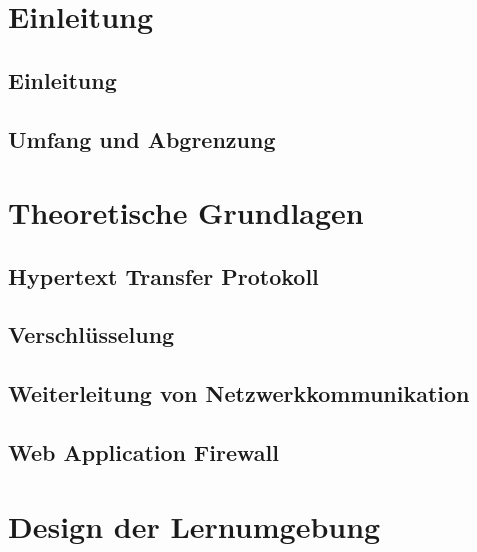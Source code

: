 \documentclass[a4paper, 12pt]{article}
\begin{document}
    
    
    

    \section{Einleitung}
    \subsection{Einleitung}
    
    \subsection{Umfang und Abgrenzung}
    
    \pagebreak

    \section{Theoretische Grundlagen}
    \label{sec:theoretical-foundations}
    \subsection{Hypertext Transfer Protokoll}
    
    \subsection{Verschlüsselung}
    
    \subsection{Weiterleitung von Netzwerkkommunikation}
    
    \subsection{Web Application Firewall}
    
    \pagebreak

    \section{Design der Lernumgebung}
    
\end{document}
